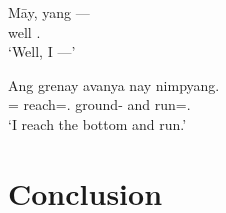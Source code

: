 \documentclass[12pt,paper=a4]{scrartcl}
\begin{document}
\begin{exe}
\ex \begin{xlist}
	\ex \label{ex:4a}
		\gll Māy, yang --- \\
			well \Fsg.\Aarg{} \\
		\trans `Well, I ---'

	\ex \label{ex:4b}
		\gll Ang grenay avanya nay nimpyang. \\
			\AgtT= reach=\Fsg.\Top{} ground-\Loc{} and run=\Fsg.\Aarg{} \\
		\trans `I reach the bottom and run.'
\end{xlist}
\end{exe}

\section{Conclusion}




\begingroup\multicolsep=0pt
\printglossary[
	style=threecolumn,
	type=leipzig,
]
\endgroup

\end{document}
